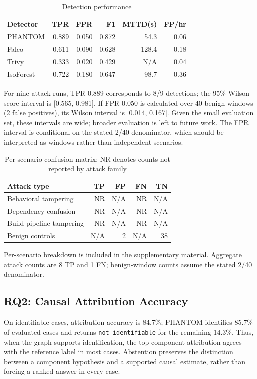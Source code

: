 \documentclass[conference]{IEEEtran}
\begin{document}
\begin{table}[t]\caption{Detection performance}\label{tab:detection}\centering\scriptsize
\begin{tabular}{lrrrrr}\toprule
Detector & TPR & FPR & F1 & MTTD(s) & FP/hr\\\midrule
PHANTOM & 0.889 & 0.050 & 0.872 & 54.3 & 0.06\\
Falco & 0.611 & 0.090 & 0.628 & 128.4 & 0.18\\
Trivy & 0.333 & 0.020 & 0.429 & N/A & 0.04\\
IsoForest & 0.722 & 0.180 & 0.647 & 98.7 & 0.36\\\bottomrule
\end{tabular}\end{table}

For nine attack runs, TPR 0.889 corresponds to 8/9 detections; the 95\% Wilson score interval is [0.565, 0.981]. If FPR 0.050 is calculated over 40 benign windows (2 false positives), its Wilson interval is [0.014, 0.167]. Given the small evaluation set, these intervals are wide; broader evaluation is left to future work. The FPR interval is conditional on the stated 2/40 denominator, which should be interpreted as windows rather than independent scenarios.

\begin{table}[t]\caption{Per-scenario confusion matrix; NR denotes counts not reported by attack family}\label{tab:scenario-cm}\centering\scriptsize
\begin{tabular}{lrrrr}\toprule
Attack type & TP & FP & FN & TN\\\midrule
Behavioral tampering & NR & N/A & NR & N/A\\
Dependency confusion & NR & N/A & NR & N/A\\
Build-pipeline tampering & NR & N/A & NR & N/A\\
Benign controls & N/A & 2 & N/A & 38\\\bottomrule
\end{tabular}\end{table}
Per-scenario breakdown is included in the supplementary material. Aggregate attack counts are 8 TP and 1 FN; benign-window counts assume the stated 2/40 denominator.

\subsection{RQ2: Causal Attribution Accuracy}
On identifiable cases, attribution accuracy is 84.7\%; PHANTOM identifies 85.7\% of evaluated cases and returns \texttt{not\_identifiable} for the remaining 14.3\%. Thus, when the graph supports identification, the top component attribution agrees with the reference label in most cases. Abstention preserves the distinction between a component hypothesis and a supported causal estimate, rather than forcing a ranked answer in every case.
\end{document}
